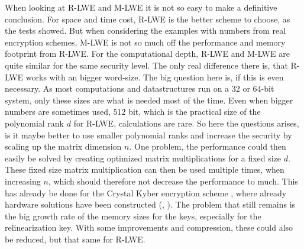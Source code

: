 When looking at R-LWE and M-LWE it is not so easy to make a definitive conclusion. For space and time cost, R-LWE is the better scheme to choose, as the tests showed. But when considering the examples with numbers from real encryption schemes, M-LWE is not so much off the performance and memory footprint from R-LWE. For the computational depth, R-LWE and M-LWE are quite similar for the same security level. The only real difference there is, that R-LWE works with an bigger word-size. The big question here is, if this is even necessary. As most computations and datastructures run on a $32$ or $64$-bit system, only these sizes are what is needed most of the time. Even when bigger numbers are sometimes used, $512$ bit, which is the practical size of the polynomial rank $d$ for R-LWE, calculations are rare. So here the questions arises, is it maybe better to use smaller polynomial ranks and increase the security by scaling up the matrix dimension $n$. One problem, the performance could then easily be solved by creating optimized matrix multiplications for a fixed size $d$. These fixed size matrix multiplication can then be used multiple times, when increasing $n$, which should therefore not decrease the performance to much. This has already be done for the Crystal Kyber encryption scheme \cite{CyrstalsKyber}, where already hardware solutions have been constructed (\cite{KyberHardware}, \cite{KyberHardware2}). The problem that still remains is the big growth rate of the memory sizes for the keys, especially for the relinearization key. With some improvements and compression, these could also be reduced, but that same for R-LWE. 

